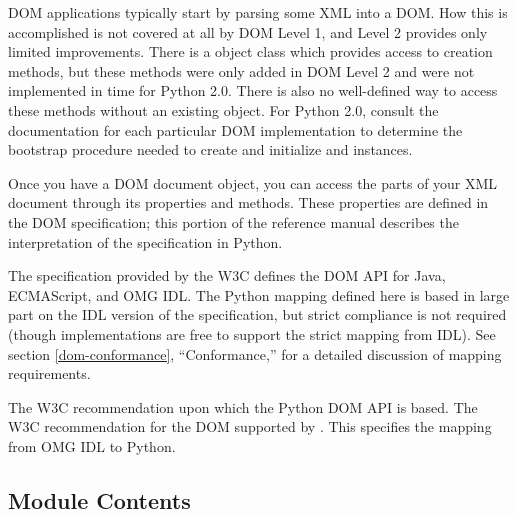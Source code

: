 DOM applications typically start by parsing some XML into a DOM.  How
this is accomplished is not covered at all by DOM Level 1, and Level 2
provides only limited improvements.  There is a
 object class which provides access to
 creation methods, but these methods were only added
in DOM Level 2 and were not implemented in time for Python 2.0.  There
is also no well-defined way to access these methods without an
existing  object.  For Python 2.0, consult the
documentation for each particular DOM implementation to determine the
bootstrap procedure needed to create and initialize 
and  instances.

Once you have a DOM document object, you can access the parts of your
XML document through its properties and methods.  These properties are
defined in the DOM specification; this portion of the reference manual
describes the interpretation of the specification in Python.

The specification provided by the W3C defines the DOM API for Java,
ECMAScript, and OMG IDL.  The Python mapping defined here is based in
large part on the IDL version of the specification, but strict
compliance is not required (though implementations are free to support
the strict mapping from IDL).  See section \ref{dom-conformance},
``Conformance,'' for a detailed discussion of mapping requirements.


\begin{seealso}
           {The W3C recommendation upon which the Python DOM API is
            based.}
           {The W3C recommendation for the
            DOM supported by .}
           {This specifies the mapping from OMG IDL to Python.}
\end{seealso}

\subsection{Module Contents}

